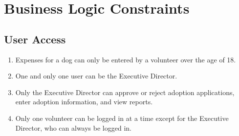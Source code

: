 \documentclass{article}
\begin{document}
\newpage
\section{Business Logic Constraints}

\subsection{User Access}
\begin{enumerate}
    \item Expenses for a dog can only be entered by a volunteer over the age of 18.
    \item One and only one user can be the Executive Director.
    \item Only the Executive Director can approve or reject adoption applications, enter adoption information, and view reports.
    \item Only one volunteer can be logged in at a time except for the Executive Director, who can always be logged in.
\end{enumerate}
\end{document}
